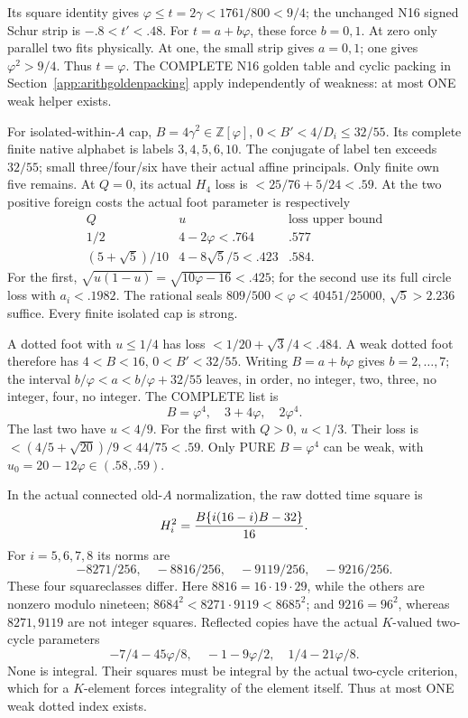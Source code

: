 \documentclass[11pt]{article}
\begin{document}
Its square identity gives
\(\varphi\le t=2\gamma<1761/800<9/4\);
the unchanged N16 signed Schur strip is
\(-.8<t'<.48\).
For \(t=a+b\varphi\), these force
\(b=0,1\).
At zero only parallel two fits physically.
At one, the small strip gives \(a=0,1\);
one gives \(\varphi^2>9/4\).
Thus \(t=\varphi\).
The COMPLETE N16 golden table and cyclic
packing in Section~\ref{app:arithgoldenpacking}
apply independently of weakness: at most
ONE weak helper exists.

For isolated-within-\(A\) cap,
\(B=4\gamma^2\in\mathbb Z[\varphi]\),
\(0<B'<4/D_i\le32/55\).
Its complete finite native alphabet is
labels \(3,4,5,6,10\).
The conjugate of label ten exceeds
\(32/55\); small three/four/six have
their actual affine principals.
Only finite own five remains.
At \(Q=0\), its actual \(H_4\) loss is
\(<25/76+5/24<.59\).
At the two positive foreign costs the
actual foot parameter is respectively
\[
 \begin{array}{c|c|c}
 Q&u&\text{loss upper bound}\\ \hline
 1/2&4-2\varphi<.764&.577\\
 (5+\sqrt5)/10&4-8\sqrt5/5<.423&.584 .
 \end{array}
\]
For the first,
\(\sqrt{u(1-u)}=\sqrt{10\varphi-16}<.425\);
for the second use its full circle loss
with \(a_i<.1982\).
The rational seals
\(809/500<\varphi<40451/25000\),
\(\sqrt5>2.236\) suffice.
Every finite isolated cap is strong.

A dotted foot with \(u\le1/4\) has loss
\(<1/20+\sqrt3/4<.484\).
A weak dotted foot therefore has
\(4<B<16\), \(0<B'<32/55\).
Writing \(B=a+b\varphi\) gives \(b=2,\ldots,7\);
the interval
\(b/\varphi<a<b/\varphi+32/55\)
leaves, in order, no integer, two, three,
no integer, four, no integer.
The COMPLETE list is
\[
                        B=\varphi^4,\quad3+4\varphi,\quad2\varphi^4 .
\]
The last two have \(u<4/9\).
For the first with \(Q>0\), \(u<1/3\).
Their loss is \(<(4/5+\sqrt{20})/9<44/75<.59\).
Only PURE \(B=\varphi^4\) can be weak,
with \(u_0=20-12\varphi\in(.58,.59)\).

In the actual connected old-\(A\) normalization,
the raw dotted time square is
\[
                  H_i^2={B\{i(16-i)B-32\}\over16}.
\]
For \(i=5,6,7,8\) its norms are
\[
                 -8271/256,\quad-8816/256,\quad-9119/256,\quad-9216/256 .
\]
These four squareclasses differ.
Here \(8816=16\cdot19\cdot29\), while the
others are nonzero modulo nineteen;
\(8684^2<8271\cdot9119<8685^2\);
and \(9216=96^2\), whereas \(8271,9119\)
are not integer squares.
Reflected copies have the actual
\(K\)-valued two-cycle parameters
\[
             -7/4-45\varphi/8,\quad-1-9\varphi/2,\quad
                                       1/4-21\varphi/8 .
\]
None is integral.
Their squares must be integral by the
actual two-cycle criterion, which for
a \(K\)-element forces integrality of the
element itself.
Thus at most ONE weak dotted index exists.
\end{document}
